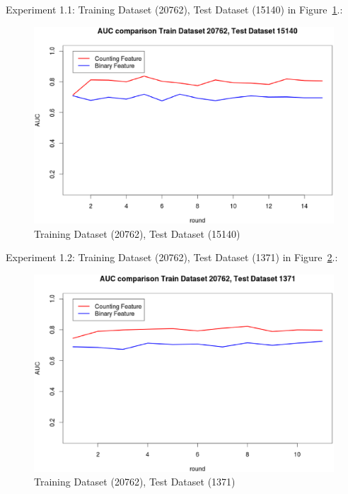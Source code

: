 \documentclass{sig-alternate}
\begin{document}
Experiment 1.1: Training Dataset  (20762), Test Dataset  (15140) in Figure~\ref{fig:fig1}.:
\begin{figure}[h]
\centering
\includegraphics[width=\columnwidth]{20762_15140.eps}
\caption{Training Dataset  (20762), Test Dataset  (15140)}
\label{fig:fig1}
\end{figure}

Experiment 1.2: Training Dataset  (20762), Test Dataset  (1371) in Figure~\ref{fig:fig2}.:
\begin{figure}[h]
\centering
\includegraphics[width=\columnwidth]{20762_1371.eps}
\caption{Training Dataset  (20762), Test Dataset  (1371)}
\label{fig:fig2}
\end{figure}
\end{document}
